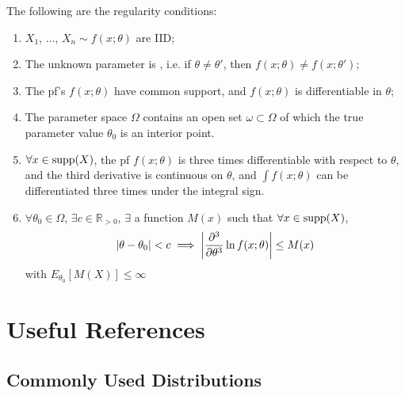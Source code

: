\documentclass[notoc,notitlepage]{tufte-book}
\begin{document}
The following are the regularity conditions:

\begin{enumerate}
  \item $X_1, \, ..., \, X_n \sim f(x ; \theta)$ are IID;
  \item The unknown parameter is , i.e. if $\theta \neq \theta'$, then $f(x ; \theta) \neq f(x; \theta')$;
  \item The pf's $f(x; \theta)$ have common support, and $f(x; \theta)$ is differentiable in $\theta$;
  \item The parameter space $\Omega$ contains an open set $\omega \subset \Omega$ of which the true parameter value $\theta_0$ is an interior point.
  \item $\forall x \in \operatorname{supp}(X)$, the pf $f(x; \theta)$ is three times differentiable with respect to $\theta$, and the third derivative is continuous on $\theta$, and $\int f(x; \theta)$ can be differentiated three times under the integral sign.
  \item $\forall \theta_0 \in \Omega$, $\exists c \in \mathbb{R}_{> 0}$, $\exists$ a function $M(x)$  such that $\forall x \in \operatorname{supp}(X)$,
    \begin{equation*}
      \left|\theta - \theta_0\right| < c \implies \left|\frac{\partial^3}{\partial \theta^3} \ln f(x; \theta)\right| \leq M(x)
    \end{equation*}
    with $E_{\theta_0}[M(X)] \leq \infty$ 
\end{enumerate}


\chapter{Useful References}%
\label{chp:appendix}

\section{Commonly Used Distributions}%
\label{sec:commonly_used_distributions}
\end{document}
